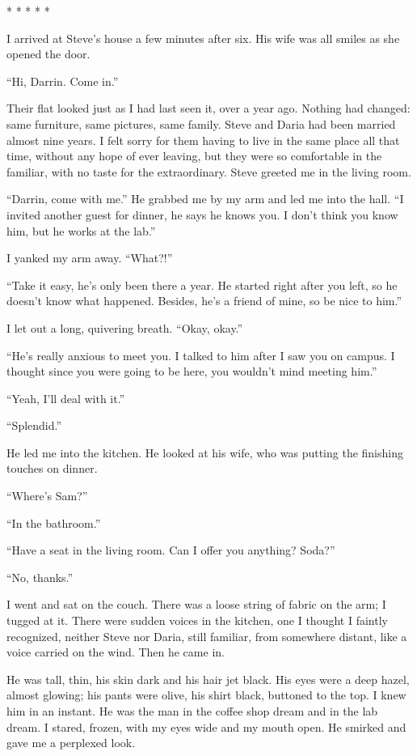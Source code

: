 * * * * *

I arrived at Steve's house a few minutes after six. His wife was all
smiles as she opened the door.

``Hi, Darrin. Come in.''

Their flat looked just as I had last seen it, over a year ago. Nothing
had changed: same furniture, same pictures, same family. Steve and Daria
had been married almost nine years. I felt sorry for them having to live
in the same place all that time, without any hope of ever leaving, but
they were so comfortable in the familiar, with no taste for the
extraordinary. Steve greeted me in the living room.

``Darrin, come with me.'' He grabbed me by my arm and led me into the
hall. ``I invited another guest for dinner, he says he knows you. I
don't think you know him, but he works at the lab.''

I yanked my arm away. ``What?!''

``Take it easy, he's only been there a year. He started right after you
left, so he doesn't know what happened. Besides, he's a friend of mine,
so be nice to him.''

I let out a long, quivering breath. ``Okay, okay.''

``He's really anxious to meet you. I talked to him after I saw you on
campus. I thought since you were going to be here, you wouldn't mind
meeting him.''

``Yeah, I'll deal with it.''

``Splendid.''

He led me into the kitchen. He looked at his wife, who was putting the
finishing touches on dinner.

``Where's Sam?''

``In the bathroom.''

``Have a seat in the living room. Can I offer you anything? Soda?''

``No, thanks.''

I went and sat on the couch. There was a loose string of fabric on the
arm; I tugged at it. There were sudden voices in the kitchen, one I
thought I faintly recognized, neither Steve nor Daria, still familiar,
from somewhere distant, like a voice carried on the wind. Then he came
in.

He was tall, thin, his skin dark and his hair jet black. His eyes were a
deep hazel, almost glowing; his pants were olive, his shirt black,
buttoned to the top. I knew him in an instant. He was the man in the
coffee shop dream and in the lab dream. I stared, frozen, with my eyes
wide and my mouth open. He smirked and gave me a perplexed look.

